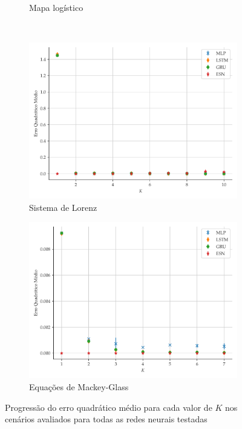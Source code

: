 \documentclass[a4paper, 12pt]{article}
\begin{document}
\begin{figure}[!ht]
\begin{subfigure}[t]{0.45\textwidth}
         \caption{Mapa logístico}
     \end{subfigure}
     \\
     \centering
     \begin{subfigure}[t]{0.45\textwidth}
         \includegraphics[scale=0.4]{progressao-k-lorenz.pdf}
         \caption{Sistema de Lorenz}
     \end{subfigure}
     \centering
     \begin{subfigure}[t]{0.45\textwidth} 
         \includegraphics[scale=0.4]{progressao-k-mackeyglass.pdf}
         \caption{Equações de Mackey-Glass}
     \end{subfigure}  
     \centering   
     \caption{Progressão do erro quadrático médio para cada valor de $K$ nos cenários avaliados para todas as redes neurais testadas}
     \label{fig:mse-progression}
\end{figure}
\end{document}
